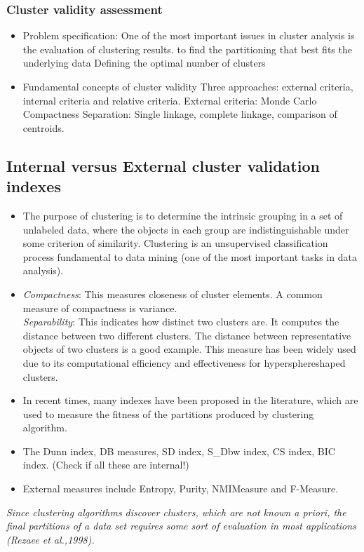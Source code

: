 \documentclass[a4paper,10pt]{article}
\begin{document}
\subsubsection{Cluster validity assessment}
\begin{itemize}
	\item Problem specification: 
		\subitem One of the most important issues in cluster analysis is the evaluation of clustering results.
		to find the partitioning that best fits the underlying data
		\subitem Defining the optimal number of clusters
	\item Fundamental concepts of cluster validity
		\subitem Three approaches: external criteria, internal criteria and relative criteria.
			\subsubitem External criteria: Monde Carlo
		\subitem Compactness
		\subitem Separation: Single linkage, complete linkage, comparison of centroids.
\end{itemize}

\subsection{Internal versus External cluster validation indexes}
\begin{itemize}
	\item The purpose of clustering is to determine the intrinsic grouping in a set of unlabeled data, where the objects in each group are indistinguishable under some criterion of similarity. Clustering is an unsupervised classification process fundamental to data mining (one of the most important tasks in data analysis).
	
	\item \textit{Compactness}: This measures closeness of cluster elements. A common measure of compactness is variance.\\
	\textit{Separability}: This indicates how distinct two clusters are. It computes the distance between two different clusters. The distance between representative objects of two clusters is a good example. This measure has been widely used due to its computational efficiency and effectiveness for hypersphereshaped clusters.
	\item In recent times, many indexes have been proposed in the literature, which are used to measure the fitness of the partitions produced by clustering algorithm.
	\item The Dunn index, DB measures, SD index, S\_Dbw index, CS index, BIC index. (Check if all these are internal!)
	\item External measures include Entropy, Purity, NMIMeasure and F-Measure.
\end{itemize}
\textit{Since clustering algorithms discover clusters, which are not known a priori, the final partitions of a data set requires some sort of evaluation in most applications (Rezaee et al.,1998).}
\end{document}
